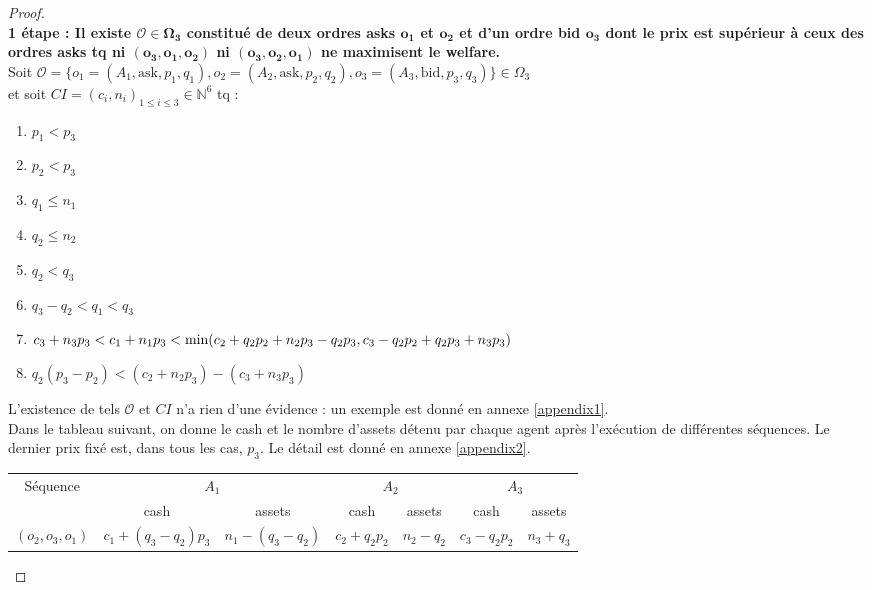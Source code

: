 \documentclass[a4paper]{article}
\newcommand{\N}{\mathbb{N}}
\newcommand{\Oc}{\mathcal{O}}
\newtheorem[style=S, bodystyle=\noindent]{thm}{Théorème}[section]
\newtheorem[style=S, bodystyle=\noindent]{defn}[thm]{Définition}
\newtheorem[style=S, bodystyle=\noindent]{propo}[thm]{Proposition}
\newtheorem[style=S, bodystyle=\noindent]{prop}[thm]{Propriété}
\newtheorem[style=S, bodystyle=\noindent]{coro}[thm]{Corollaire}
\newtheorem[style=S, bodystyle=\noindent]{lem}[thm]{Lemme}
\newtheorem[style=S, headstyle=\bfseries\boldmath Théorème, bodystyle=\noindent]{thm*}{Théorème}
\newtheorem[style=S, headstyle=\bfseries\boldmath Définition, bodystyle=\noindent]{defn*}{Définition}
\newtheorem[style=S, headstyle=\bfseries\boldmath Proposition, bodystyle=\noindent]{propo*}{Proposition}
\newtheorem[style=S, headstyle=\bfseries\boldmath Propriété, bodystyle=\noindent]{prop*}{Propriété}
\newtheorem[style=S, headstyle=\bfseries\boldmath Corollaire, bodystyle=\noindent]{coro*}{Corollaire}
\newtheorem[style=S, headstyle=\bfseries\boldmath Lemme, bodystyle=\noindent]{lem*}{Lemme}
\begin{document}
\begin{proof}
	~\\
	\textbf{1 étape : Il existe $\boldsymbol{\Oc \in \Omega_3}$ constitué de deux ordres asks $\boldsymbol{o_1}$ et $\boldsymbol{o_2}$ et d'un ordre bid $\boldsymbol{o_3}$ dont le prix est supérieur à ceux des ordres asks tq ni $\boldsymbol{(o_3, o_1, o_2)}$ ni $\boldsymbol{(o_3, o_2, o_1)}$ ne maximisent le welfare.} \\
	Soit $\Oc = \{o_1 = (A_1, \text{ask}, p_1, q_1) , o_2 = (A_2, \text{ask}, p_2, q_2), o_3 = (A_3, \text{bid}, p_3, q_3)\} \in \Omega_3$ \\ et soit $CI = (c_i, n_i)_{1\leq i\leq 3} \in \N^6$ tq :
	\begin{multicols}{2}
	\begin{enumerate}
		\item $p_1 < p_3$
		\item $p_2 < p_3$
		\item $q_1 \leq n_1$
		\item $q_2 \leq n_2$
		\item $q_2 < q_3$
		\item $q_3 - q_2 < q_1 < q_3$
		\item $c_3 + n_3p_3 < c_1 + n_1p_3 \\< \min(c_2 + q_2p_2 + n_2p_3 - q_2p_3,\\c_3 - q_2p_2 + q_2p_3 + n_3p_3)$
		\item $q_2(p_3-p_2) < (c_2 + n_2p_3) - (c_3 + n_3p_3)$\\
	\end{enumerate}
	\end{multicols}
	L'existence de tels $\Oc$ et $CI$ n'a rien d'une évidence : un exemple est donné en annexe \ref{appendix1}. \\
	Dans le tableau suivant, on donne le cash et le nombre d'assets détenu par chaque agent après l'exécution de différentes séquences. Le dernier prix fixé est, dans tous les cas, $p_3$. Le détail est donné en annexe \ref{appendix2}. \\
	\begin{center}
	\begin{tabular}{|c|c|c|c|c|c|c|}
		\hline
		\multirow{2}{*}{Séquence} & \multicolumn{2}{c|}{$A_1$} & \multicolumn{2}{c|}{$A_2$} & \multicolumn{2}{c|}{$A_3$} \\
		\cline{2-7}
		& cash & assets & cash & assets & cash & assets \\
		\hline
		\multirow{2}{*}{$(o_2, o_3, o_1)$} & \multirow{2}{*}{$c_1 + (q_3-q_2)p_3$} & \multirow{2}{*}{$n_1 - (q_3-q_2)$} & \multirow{2}{*}{$c_2 + q_2p_2$} & \multirow{2}{*}{$n_2-q_2$} & $c_3 - q_2p_2$ & \multirow{2}{*}{$n_3+q_3$} \\

\end{tabular}
\end{center}
\end{proof}
\end{document}
